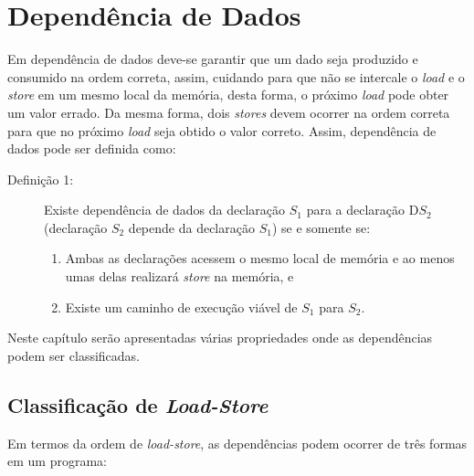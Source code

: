 \section{Dependência de Dados}

Em dependência de dados deve-se garantir que um dado seja produzido e consumido
na ordem correta, assim, cuidando para que não se intercale o \textit{load} e o
\textit{store} em um mesmo local da memória, desta forma, o próximo
\textit{load} pode obter um valor errado. 
Da mesma forma, dois \textit{stores} devem ocorrer na ordem correta para 
que no próximo \textit{load} seja obtido o valor correto.
Assim, dependência de dados pode ser definida como:

\begin{description}
        \item [Definição 1:] Existe dependência de dados da declaração $S_1$ para a declaração 
D$S_2$ (declaração $S_2$ depende da declaração $S_1$) se e somente se:
\begin{enumerate}
        \item Ambas as declarações acessem o mesmo local de memória e ao menos
                umas delas realizará \textit{store} na memória, e
        \item Existe um caminho de execução viável de $S_1$ para $S_2$.
\end{enumerate}
\end{description}

Neste capítulo serão apresentadas várias propriedades onde as dependências 
podem ser classificadas.


\subsection{Classificação de \textit{Load-Store}}

Em termos da ordem de \textit{load-store}, as dependências podem ocorrer de 
três formas em um programa:

